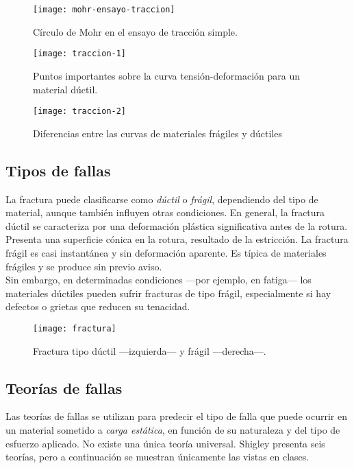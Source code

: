 \documentclass[spanish,11pt,a4paper]{article}
\begin{document}
	  \begin{figure}[h]
	  	\centering\caption{Círculo de Mohr en el ensayo de tracción simple.}\texttt{[image: mohr-ensayo-traccion]}
	  \end{figure}
	  
	  \begin{figure}[h]
	  	\centering\caption{Puntos importantes sobre la curva tensión-deformación para un material dúctil.}
	  	\texttt{[image: traccion-1]}
	  \end{figure}
	  \begin{figure}[h]
	  	\centering
	  		\caption{Diferencias entre las curvas de materiales frágiles y dúctiles}
	  	\texttt{[image: traccion-2]}
	  	
	  \end{figure}
	
	\subsection{Tipos de fallas}
	
	La fractura puede clasificarse como \emph{dúctil} o \emph{frágil}, dependiendo del tipo de material, aunque también influyen otras condiciones. En general, la fractura dúctil se caracteriza por una deformación plástica significativa antes de la rotura. Presenta una superficie cónica en la rotura, resultado de la estricción. La fractura frágil es casi instantánea y sin deformación aparente. Es típica de materiales frágiles y se produce sin previo aviso.\\
	
	Sin embargo, en determinadas condiciones —por ejemplo, en fatiga— los materiales dúctiles pueden sufrir fracturas de tipo frágil, especialmente si hay defectos o grietas que reducen su tenacidad.
	
	
	\begin{figure}[h]
		\centering
		\caption{Fractura tipo dúctil —izquierda— y frágil —derecha—.}
		\texttt{[image: fractura]}
	\end{figure}
	
	\subsection{Teorías de fallas}
	Las teorías de fallas se utilizan para predecir el tipo de falla que puede ocurrir en un material sometido a \emph{carga estática}, en función de su naturaleza y del tipo de esfuerzo aplicado. No existe una única teoría universal. Shigley presenta seis teorías, pero a continuación se muestran únicamente las vistas en clases.
	
\end{document}

